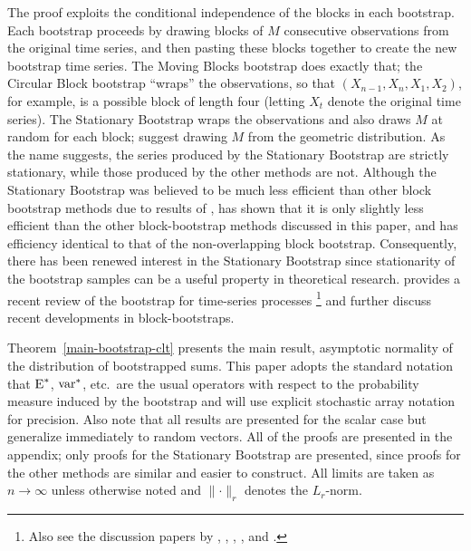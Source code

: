 \documentclass[11pt]{article}
\begin{document}
The proof exploits the conditional independence of the blocks in each
bootstrap.  Each bootstrap proceeds by drawing blocks of $M$
consecutive observations from the original time series, and then
pasting these blocks together to create the new bootstrap time series.
The Moving Blocks bootstrap does exactly that; the Circular Block
bootstrap ``wraps'' the observations, so that $(X_{n-1}, X_n, X_1,
X_2)$, for example, is a possible block of length four (letting $X_t$
denote the original time series).  The Stationary Bootstrap wraps the
observations and also draws $M$ at random for each block;
\citet{PoR:94} suggest drawing $M$ from the geometric distribution.
As the name suggests, the series produced by the Stationary Bootstrap
are strictly stationary, while those produced by the other methods are
not.  Although the Stationary Bootstrap was believed to be much less
efficient than other block bootstrap methods due to results of
\citet{Lah:99}, \citet{Nor:09} has shown that it is only slightly less
efficient than the other block-bootstrap methods discussed in this
paper, and has efficiency identical to that of the non-overlapping
block bootstrap.  Consequently, there has been renewed interest in the
Stationary Bootstrap since stationarity of the bootstrap samples can
be a useful property in theoretical research.  \cite{KrP:11} provides
a recent review of the bootstrap for time-series
processes%
\footnote{Also see the discussion papers by \citet{Dah:11},
\citet{GoP:11}, \citet{Hor:11}, \citet{JeM:11}, and
\citet{KrP:11b}.} %
and \citet{GoP:11} further discuss recent developments in
block-bootstraps.

Theorem~\ref{main-bootstrap-clt} presents the main result, asymptotic normality of
the distribution of bootstrapped sums. This paper adopts the
standard notation that $\operatorname{E}^{*}$, $\operatorname{var}^{*}$, etc.\ are the usual
operators with respect to the probability measure induced by the
bootstrap and will use explicit stochastic array notation
for precision.  Also note that all results are presented for the
scalar case but generalize immediately to random vectors.  All of the
proofs are presented in the appendix; only proofs for the Stationary
Bootstrap are presented, since proofs for the other methods are
similar and easier to construct.  All limits are taken as $n \to \infty$
unless otherwise noted and $\lVert \cdot \rVert_r$ denotes the
$L_r$-norm.
\end{document}
